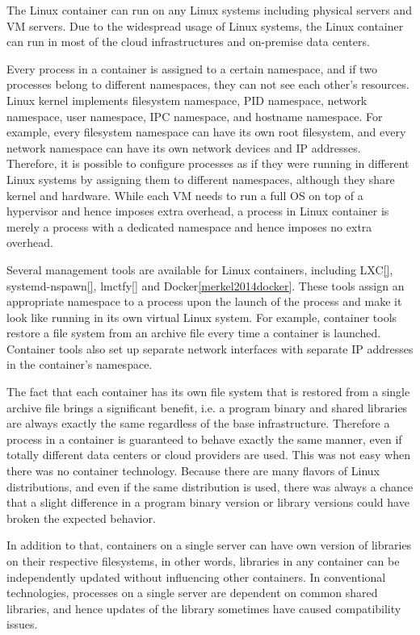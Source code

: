 The Linux container can run on any Linux systems including physical servers and VM servers.
Due to the widespread usage of Linux systems, the Linux container can run in most of the cloud infrastructures and on-premise data centers.

Every process in a container is assigned to a certain namespace, and if two processes belong to different namespaces, they can not see each other's resources. 
Linux kernel implements filesystem namespace, PID namespace, network namespace, user namespace, IPC namespace, and hostname namespace. 
For example, every filesystem namespace can have its own root filesystem, and every network namespace can have its own network devices and IP addresses.
Therefore, it is possible to configure processes as if they were running in different Linux systems by assigning them to different namespaces, although they share kernel and hardware.
While each VM needs to run a full OS on top of a hypervisor and hence imposes extra overhead, a process in Linux container is merely a process with a dedicated namespace and hence imposes no extra overhead.

Several management tools are available for Linux containers, including LXC\ref{}, systemd-nspawn\ref{}, lmctfy\ref{} and Docker\ref{merkel2014docker}.
These tools assign an appropriate namespace to a process upon the launch of the process and make it look like running in its own virtual Linux system.
For example, container tools restore a file system from an archive file every time a container is launched. 
Container tools also set up separate network interfaces with separate IP addresses in the container's namespace.

The fact that each container has its own file system that is restored from a single archive file brings a significant benefit, i.e. a program binary and shared libraries are always exactly the same regardless of the base infrastructure.
Therefore a process in a container is guaranteed to behave exactly the same manner, even if totally different data centers or cloud providers are used.
This was not easy when there was no container technology.
Because there are many flavors of Linux distributions, and even if the same distribution is used, there was always a chance that a slight difference in a program binary version or library versions could have broken the expected behavior.

In addition to that, containers on a single server can have own version of libraries on their respective filesystems, in other words, libraries in any container can be independently updated without influencing other containers.
In conventional technologies, processes on a single server are dependent on common shared libraries, and hence updates of the library sometimes have caused compatibility issues.

